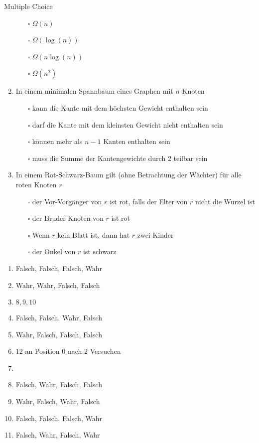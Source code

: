 \documentclass{article}
\begin{document}
\begin{exercise}{Multiple Choice}
\begin{enumerate}
          \begin{itemize}
            \item[$\square$] $\Omega(n)$
            \item[$\square$] $\Omega(\log(n))$
            \item[$\square$] $\Omega(n \log(n))$
            \item[$\square$] $\Omega(n^2)$
          \end{itemize}
    \item In einem minimalen Spannbaum eines Graphen mit $n$ Knoten
          \begin{itemize}
            \item[$\square$] kann die Kante mit dem höchsten Gewicht enthalten sein
            \item[$\square$] darf die Kante mit dem kleinsten Gewicht nicht enthalten sein
            \item[$\square$] können mehr als $n - 1$ Kanten enthalten sein
            \item[$\square$] muss die Summe der Kantengewichte durch 2 teilbar sein
          \end{itemize}
    \item In einem Rot-Schwarz-Baum gilt (ohne Betrachtung der Wächter) für alle roten Knoten $r$
          \begin{itemize}
            \item[$\square$] der Vor-Vorgänger von $r$ ist rot, falls der Elter von $r$ nicht die Wurzel ist
            \item[$\square$] der Bruder Knoten von $r$ ist rot
            \item[$\square$] Wenn $r$ kein Blatt ist, dann hat $r$ zwei Kinder
            \item[$\square$] der Onkel von $r$ ist schwarz
          \end{itemize}
  \end{enumerate}
  \begin{solution}
    \begin{enumerate}
      \item Falsch, Falsch, Falsch, Wahr
      \item Wahr, Wahr, Falsch, Falsch
      \item $8, 9, 10$
      \item Falsch, Falsch, Wahr, Falsch
      \item Wahr, Falsch, Falsch, Falsch
      \item $12$ an Position $0$ nach $2$ Versuchen
      \item 
      \item Falsch, Wahr, Falsch, Falsch
      \item Wahr, Falsch, Wahr, Falsch
      \item Falsch, Falsch, Falsch, Wahr
      \item Falsch, Wahr, Falsch, Wahr
    \end{enumerate}
  \end{solution}
\end{exercise}
\end{document}
